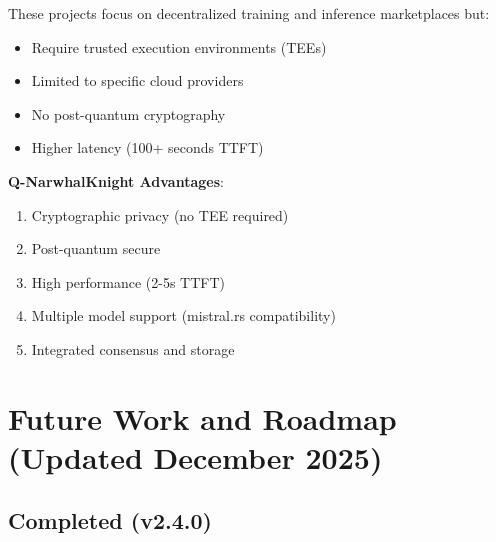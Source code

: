 \documentclass[11pt,a4paper]{article}
\begin{document}
These projects focus on decentralized training and inference marketplaces but:
\begin{itemize}
    \item Require trusted execution environments (TEEs)
    \item Limited to specific cloud providers
    \item No post-quantum cryptography
    \item Higher latency (100+ seconds TTFT)
\end{itemize}

\textbf{Q-NarwhalKnight Advantages}:
\begin{enumerate}
    \item Cryptographic privacy (no TEE required)
    \item Post-quantum secure
    \item High performance (2-5s TTFT)
    \item Multiple model support (mistral.rs compatibility)
    \item Integrated consensus and storage
\end{enumerate}

\newpage
\section{Future Work and Roadmap (Updated December 2025)}

\subsection{Completed (v2.4.0)}
\end{document}
